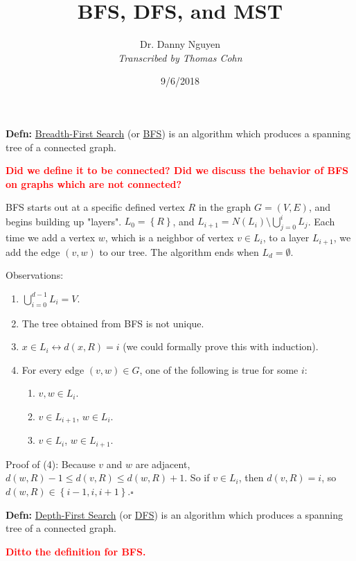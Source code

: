 \documentclass[10pt,letterpaper]{article}
\author{Dr. Danny Nguyen\\ \small\textit{Transcribed by Thomas Cohn}}
\title{BFS, DFS, and MST}
\date{9/6/2018} %
\newcommand{\n}{\hfill\break}
\newcommand{\defn}[1]{\par\noindent\settowidth{\hangindent}{\textbf{Defn: }}\textbf{Defn: }#1\n}
\newcommand{\proven}{\;$\square$\n}
\newcommand{\set}[1]{\left\{#1\right\}}
\newcommand{\flag}[1]{\textbf{\textcolor{red}{#1}}}
\begin{document}
\maketitle
\setlength\RaggedRightParindent{\parindent}
\RaggedRight

\defn{\underline{Breadth-First Search} (or \underline{BFS}) is an algorithm which produces a spanning tree of a connected graph.}

\par\noindent\flag{Did we define it to be connected? Did we discuss the behavior of BFS on graphs which are not connected?}\n

\par\noindent BFS starts out at a specific defined vertex $R$ in the graph $G=(V,E)$, and begins building up "layers". $L_{0}=\set{R}$, and $L_{i+1}=N(L_{i})\setminus\bigcup_{j=0}^{i}L_{j}$. Each time we add a vertex $w$, which is a neighbor of vertex $v\in{}L_{i}$, to a layer $L_{i+1}$, we add the edge $(v,w)$ to our tree. The algorithm ends when $L_{d}=\emptyset$.\n

\par\noindent Observations:
\begin{enumerate}
	\item $\bigcup_{i=0}^{d-1}L_{i}=V$.
	\item The tree obtained from BFS is not unique.
	\item $x\in{}L_{i}\leftrightarrow{}d(x,R)=i$ (we could formally prove this with induction).
	\item For every edge $(v,w)\in{}G$, one of the following is true for some $i$:
		\begin{enumerate}
			\item $v,w\in{}L_{i}$.
			\item $v\in{}L_{i+1}$, $w\in{}L_{i}$.
			\item $v\in{}L_{i}$, $w\in{}L_{i+1}$.
		\end{enumerate}
\end{enumerate}

\par\noindent Proof of (4):\n
Because $v$ and $w$ are adjacent, $d(w,R)-1\le{}d(v,R)\le{}d(w,R)+1$.\n
So if $v\in{}L_{i}$, then $d(v,R)=i$, so $d(w,R)\in\set{i-1,i,i+1}$.\proven

\defn{\underline{Depth-First Search} (or \underline{DFS}) is an algorithm which produces a spanning tree of a connected graph.}

\par\noindent\flag{Ditto the definition for BFS.}\n
\end{document}
